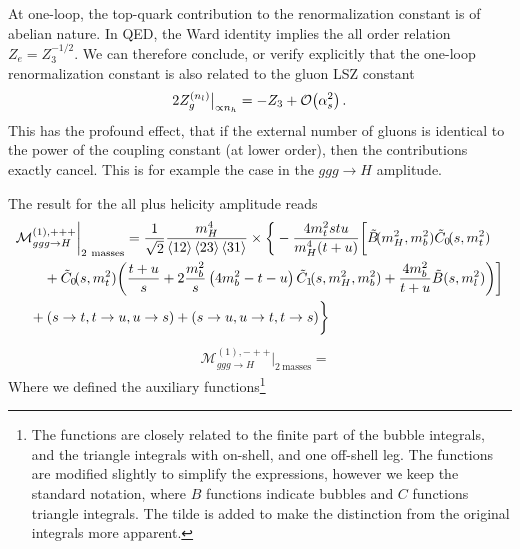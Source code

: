 At one-loop, the top-quark contribution to the renormalization constant is of abelian nature. In \acs{QED}, the Ward identity implies the all order relation $Z_e = Z_3^{-1/2}$. We can therefore conclude, or verify explicitly that the one-loop renormalization constant is also related to the gluon LSZ constant
\begin{equation}
2 Z_g^{(n_l)} \big \vert_{\propto n_h} = - Z_3 + \mathcal{O}\!\left(\alpha_s^2\right).
\end{equation}
This has the profound effect, that if the external number of gluons is identical to the power of the coupling constant (at lower order), then the contributions exactly cancel. This is for example the case in the $ggg \rightarrow H$ amplitude.

The result for the all plus helicity amplitude reads
\begin{equation}
\begin{split}
&\mathcal{M}^{(1),+++}_{ggg \rightarrow H} \bigg \vert_{2\ \text{masses}} = \frac{1}{\sqrt{2}} \frac{m_H^4}{\braket{12}\braket{23} \braket{31}}  \times \bigg \lbrace -  \frac{4 m_t^2 s t u}{ m_H^4(t + u)} \bigg [ \tilde{B}\!(m_H^2, m_b^2) \tilde{C}_0\!(s, m_t^2) \\
& \qquad + \tilde{C}_0\!(s, m_t^2) \bigg (\frac{t + u}{s} + 2 \frac{m_b^2}{s} \left( 4 m_b^2 - t - u \right) \tilde{C}_1\!(s, m_H^2, m_b^2) + \frac{4 m_b^2}{t + u} \tilde{B}(s, m_l^2) \bigg ) \bigg ] \\
& \quad + (s \rightarrow t, t \rightarrow u, u \rightarrow s) + (s \rightarrow u, u \rightarrow t, t \rightarrow s)\bigg \rbrace
\end{split}
\end{equation}
%
%
\begin{equation}
\begin{split}
&\mathcal{M}^{(1),-++}_{ggg \rightarrow H} \bigg \vert_{2\ \text{masses}} =
\end{split}
\end{equation}
Where we defined the auxiliary functions\footnote{The functions are closely related to the finite part of the bubble integrals, and the triangle integrals with on-shell, and one off-shell leg. The functions are modified slightly to simplify the expressions, however we keep the standard notation, where $B$ functions indicate bubbles and $C$ functions triangle integrals. The tilde is added to make the distinction from the original integrals more apparent.}
